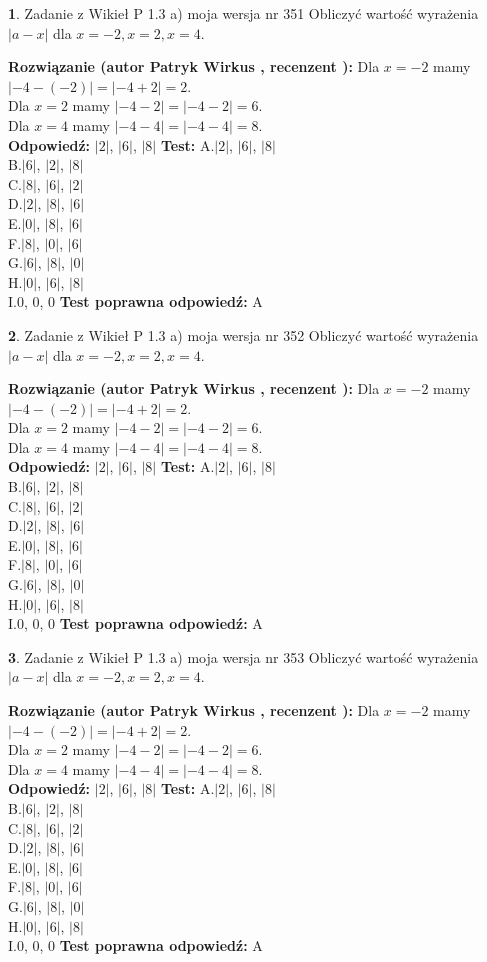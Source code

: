 \documentclass[12pt, a4paper]{article}
\theoremstyle{definition} %
\newtheorem{zad}{}
\newcommand{\zadStart}[1]{\begin{zad}#1\newline}
\newcommand{\zadStop}{\end{zad}}
\newcommand{\rozwStart}[2]{\noindent \textbf{Rozwiązanie (autor #1 , recenzent #2): }\newline}
\newcommand{\rozwStop}{\newline}
\newcommand{\odpStart}{\noindent \textbf{Odpowiedź:}\newline}
\newcommand{\odpStop}{\newline}
\newcommand{\testStart}{\noindent \textbf{Test:}\newline}
\newcommand{\testStop}{\newline}
\newcommand{\kluczStart}{\noindent \textbf{Test poprawna odpowiedź:}\newline}
\newcommand{\kluczStop}{\newline}
\begin{document}
\zadStart{Zadanie z Wikieł P 1.3 a) moja wersja nr 351}
Obliczyć wartość wyrażenia $|a - x|$ dla $x=-2,x=2,x=4$.
\zadStop
\rozwStart{Patryk Wirkus}{}
Dla $x = -2$ mamy $|-4 - (-2)| = |-4 + 2| = 2$.\\
Dla $x = 2$ mamy $|-4 - 2| = |-4 - 2| = 6$.\\
Dla $x = 4$ mamy $|-4 - 4| = |-4 - 4| = 8$.\\
\rozwStop
\odpStart
$|2|$, $|6|$, $|8|$
\odpStop
\testStart
A.$|2|$, $|6|$, $|8|$\\
B.$|6|$, $|2|$, $|8|$\\
C.$|8|$, $|6|$, $|2|$\\
D.$|2|$, $|8|$, $|6|$\\
E.$|0|$, $|8|$, $|6|$\\
F.$|8|$, $|0|$, $|6|$\\
G.$|6|$, $|8|$, $|0|$\\
H.$|0|$, $|6|$, $|8|$\\
I.$0$, $0$, $0$
\testStop
\kluczStart
A
\kluczStop



\zadStart{Zadanie z Wikieł P 1.3 a) moja wersja nr 352}
Obliczyć wartość wyrażenia $|a - x|$ dla $x=-2,x=2,x=4$.
\zadStop
\rozwStart{Patryk Wirkus}{}
Dla $x = -2$ mamy $|-4 - (-2)| = |-4 + 2| = 2$.\\
Dla $x = 2$ mamy $|-4 - 2| = |-4 - 2| = 6$.\\
Dla $x = 4$ mamy $|-4 - 4| = |-4 - 4| = 8$.\\
\rozwStop
\odpStart
$|2|$, $|6|$, $|8|$
\odpStop
\testStart
A.$|2|$, $|6|$, $|8|$\\
B.$|6|$, $|2|$, $|8|$\\
C.$|8|$, $|6|$, $|2|$\\
D.$|2|$, $|8|$, $|6|$\\
E.$|0|$, $|8|$, $|6|$\\
F.$|8|$, $|0|$, $|6|$\\
G.$|6|$, $|8|$, $|0|$\\
H.$|0|$, $|6|$, $|8|$\\
I.$0$, $0$, $0$
\testStop
\kluczStart
A
\kluczStop



\zadStart{Zadanie z Wikieł P 1.3 a) moja wersja nr 353}
Obliczyć wartość wyrażenia $|a - x|$ dla $x=-2,x=2,x=4$.
\zadStop
\rozwStart{Patryk Wirkus}{}
Dla $x = -2$ mamy $|-4 - (-2)| = |-4 + 2| = 2$.\\
Dla $x = 2$ mamy $|-4 - 2| = |-4 - 2| = 6$.\\
Dla $x = 4$ mamy $|-4 - 4| = |-4 - 4| = 8$.\\
\rozwStop
\odpStart
$|2|$, $|6|$, $|8|$
\odpStop
\testStart
A.$|2|$, $|6|$, $|8|$\\
B.$|6|$, $|2|$, $|8|$\\
C.$|8|$, $|6|$, $|2|$\\
D.$|2|$, $|8|$, $|6|$\\
E.$|0|$, $|8|$, $|6|$\\
F.$|8|$, $|0|$, $|6|$\\
G.$|6|$, $|8|$, $|0|$\\
H.$|0|$, $|6|$, $|8|$\\
I.$0$, $0$, $0$
\testStop
\kluczStart
A
\kluczStop
\end{document}
